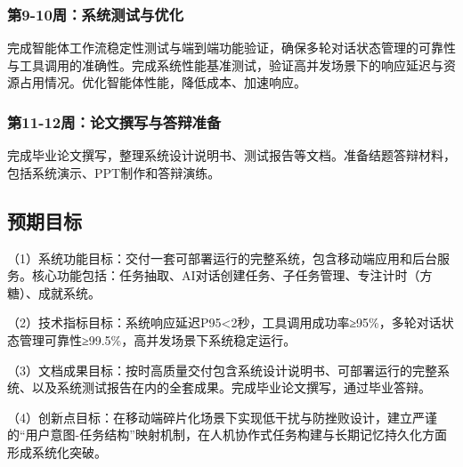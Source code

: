 \subsubsection{第9-10周：系统测试与优化}

\par 完成智能体工作流稳定性测试与端到端功能验证，确保多轮对话状态管理的可靠性与工具调用的准确性。完成系统性能基准测试，验证高并发场景下的响应延迟与资源占用情况。优化智能体性能，降低成本、加速响应。

\subsubsection{第11-12周：论文撰写与答辩准备}

\par 完成毕业论文撰写，整理系统设计说明书、测试报告等文档。准备结题答辩材料，包括系统演示、PPT制作和答辩演练。

\subsection{预期目标}

\par （1）系统功能目标：交付一套可部署运行的完整系统，包含移动端应用和后台服务。核心功能包括：任务抽取、AI对话创建任务、子任务管理、专注计时（方糖）、成就系统。

\par （2）技术指标目标：系统响应延迟P95<2秒，工具调用成功率≥95\%，多轮对话状态管理可靠性≥99.5\%，高并发场景下系统稳定运行。

\par （3）文档成果目标：按时高质量交付包含系统设计说明书、可部署运行的完整系统、以及系统测试报告在内的全套成果。完成毕业论文撰写，通过毕业答辩。

\par （4）创新点目标：在移动端碎片化场景下实现低干扰与防挫败设计，建立严谨的“用户意图-任务结构”映射机制，在人机协作式任务构建与长期记忆持久化方面形成系统化突破。

